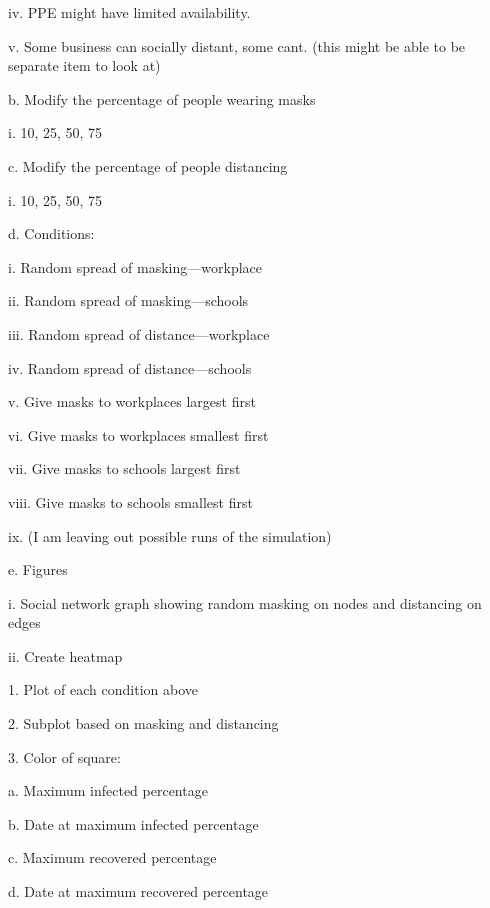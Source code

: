 \documentclass{article}
\begin{document}
iv.	PPE might have limited availability.

v.	Some business can socially distant, some cant. (this might be able to be separate item to look at)

b.	Modify the percentage of people wearing masks

i.	10, 25, 50, 75

c.	Modify the percentage of people distancing

i.	10, 25, 50, 75

d.	Conditions:

i.	Random spread of masking—workplace

ii.	Random spread of masking—schools

iii.	Random spread of distance—workplace

iv.	Random spread of distance—schools

v.	Give masks to workplaces largest first

vi.	Give masks to workplaces smallest first

vii.	Give masks to schools largest first

viii.	Give masks to schools smallest first

ix.	(I am leaving out possible runs of the simulation)

e.	Figures

i.	Social network graph showing random masking on nodes and distancing on edges

ii.	Create heatmap

1.	Plot of each condition above

2.	Subplot based on masking and distancing

3.	Color of square:

a.	Maximum infected percentage

b.	Date at maximum infected percentage

c.	Maximum recovered percentage

d.	Date at maximum recovered percentage
\end{document}
